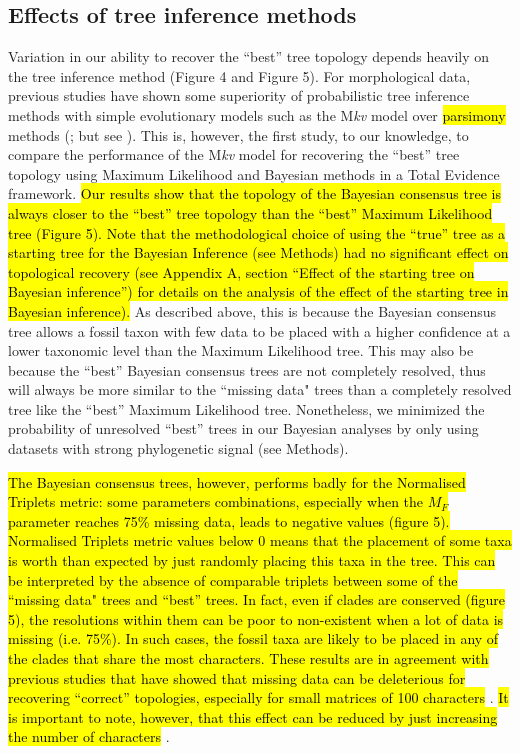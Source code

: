 \documentclass[12pt,letterpaper]{article}
\begin{document}
\subsection{Effects of tree inference methods}
Variation in our ability to recover the ``best'' tree topology depends heavily on the tree inference method (Figure 4 and Figure 5).
For morphological data, previous studies have shown some superiority of probabilistic tree inference methods with simple evolutionary models such as the M\textit{kv} model \citep{lewisa2001} over \hl{parsimony} methods (\citealp{wrightbayesian2014}; but see \citealp{spencerefficacy2013}).
This is, however, the first study, to our knowledge, to compare the performance of the M\textit{kv} model \citep{lewisa2001} for recovering the ``best'' tree topology using Maximum Likelihood and Bayesian methods in a Total Evidence framework.
\hl{Our results show that the topology of the Bayesian consensus tree is always closer to the ``best'' tree topology than the ``best'' Maximum Likelihood tree (Figure 5).
Note that the methodological choice of using the ``true'' tree as a starting tree for the Bayesian Inference (see Methods) had no significant effect on topological recovery (see Appendix A, section ``Effect of the starting tree on Bayesian inference'') for details on the analysis of the effect of the starting tree in Bayesian inference).}
As described above, this is because the Bayesian consensus tree allows a fossil taxon with few data to be placed with a higher confidence at a lower taxonomic level than the Maximum Likelihood tree.
This may also be because the ``best'' Bayesian consensus trees are not completely resolved, thus will always be more similar to the ``missing data" trees than a completely resolved tree like the ``best'' Maximum Likelihood tree.
Nonetheless, we minimized the probability of unresolved ``best'' trees in our Bayesian analyses by only using datasets with strong phylogenetic signal (see Methods).

\hl{The Bayesian consensus trees, however, performs badly for the Normalised Triplets metric: some parameters combinations, especially when the $M_F$ parameter reaches 75\% missing data, leads to negative values (figure 5).
Normalised Triplets metric values below 0 means that the placement of some taxa is worth than expected by just randomly placing this taxa in the tree.
This can be interpreted by the absence of comparable triplets between some of the ``missing data" trees and ``best'' trees.
In fact, even if clades are conserved (figure 5), the resolutions within them can be poor to non-existent when a lot of data is missing (i.e. 75\%).
In such cases, the fossil taxa are likely to be placed in any of the clades that share the most characters.
These results are in agreement with previous studies that have showed that missing data can be deleterious for recovering ``correct'' topologies, especially for small matrices of 100 characters }\citep{wiensmissing2003}.
\hl{It is important to note, however, that this effect can be reduced by just increasing the number of characters }\citep{wiensmissing2003}.
\end{document}
